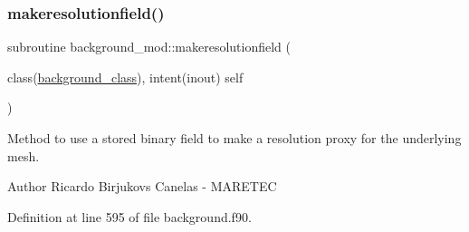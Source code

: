 \subsubsection{\texorpdfstring{makeresolutionfield()}{makeresolutionfield()}}
{\footnotesize\ttfamily subroutine background\+\_\+mod\+::makeresolutionfield (\begin{DoxyParamCaption}\item[{class(\mbox{\hyperlink{structbackground__mod_1_1background__class}{background\+\_\+class}}), intent(inout)}]{self }\end{DoxyParamCaption})\hspace{0.3cm}{\ttfamily [private]}}



Method to use a stored binary field to make a resolution proxy for the underlying mesh. 

\begin{DoxyAuthor}{Author}
Ricardo Birjukovs Canelas -\/ M\+A\+R\+E\+T\+EC 
\end{DoxyAuthor}


Definition at line 595 of file background.\+f90.


